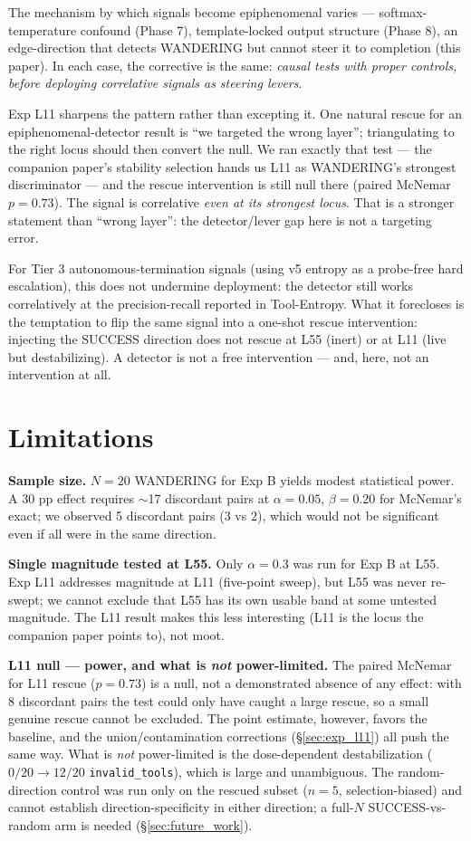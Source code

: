 \documentclass[11pt]{article}
\begin{document}
The mechanism by which signals become epiphenomenal varies --- softmax-temperature confound (Phase 7), template-locked output structure (Phase 8), an edge-direction that detects WANDERING but cannot steer it to completion (this paper). In each case, the corrective is the same: \emph{causal tests with proper controls, before deploying correlative signals as steering levers}.

Exp L11 sharpens the pattern rather than excepting it. One natural rescue for an epiphenomenal-detector result is ``we targeted the wrong layer''; triangulating to the right locus should then convert the null. We ran exactly that test --- the companion paper's stability selection hands us L11 as WANDERING's strongest discriminator --- and the rescue intervention is still null there (paired McNemar $p=0.73$). The signal is correlative \emph{even at its strongest locus}. That is a stronger statement than ``wrong layer'': the detector/lever gap here is not a targeting error.

For Tier 3 autonomous-termination signals (using v5 entropy as a probe-free hard escalation), this does not undermine deployment: the detector still works correlatively at the precision-recall reported in Tool-Entropy. What it forecloses is the temptation to flip the same signal into a one-shot rescue intervention: injecting the SUCCESS direction does not rescue at L55 (inert) or at L11 (live but destabilizing). A detector is not a free intervention --- and, here, not an intervention at all.

\section{Limitations}\label{sec:limitations}

\textbf{Sample size.} $N=20$ WANDERING for Exp B yields modest statistical power. A 30 pp effect requires $\sim$17 discordant pairs at $\alpha=0.05$, $\beta=0.20$ for McNemar's exact; we observed 5 discordant pairs (3 vs 2), which would not be significant even if all were in the same direction.

\textbf{Single magnitude tested at L55.} Only $\alpha=0.3$ was run for Exp B at L55. Exp L11 addresses magnitude at L11 (five-point sweep), but L55 was never re-swept; we cannot exclude that L55 has its own usable band at some untested magnitude. The L11 result makes this less interesting (L11 is the locus the companion paper points to), not moot.

\textbf{L11 null --- power, and what is \emph{not} power-limited.} The paired McNemar for L11 rescue ($p=0.73$) is a null, not a demonstrated absence of any effect: with 8 discordant pairs the test could only have caught a large rescue, so a small genuine rescue cannot be excluded. The point estimate, however, favors the baseline, and the union/contamination corrections (\S\ref{sec:exp_l11}) all push the same way. What is \emph{not} power-limited is the dose-dependent destabilization ($0/20 \to 12/20$ \texttt{invalid\_tools}), which is large and unambiguous. The random-direction control was run only on the rescued subset ($n=5$, selection-biased) and cannot establish direction-specificity in either direction; a full-$N$ SUCCESS-vs-random arm is needed (\S\ref{sec:future_work}).
\end{document}

